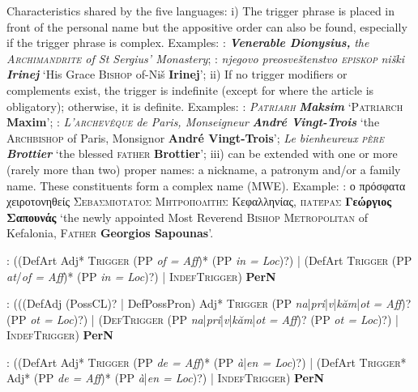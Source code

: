 \documentclass[output=paper]{langsci/langscibook}
\newcommand{\trigger}[1]{\textsc{#1}}
\begin{document}
Characteristics shared by the five languages: i) The trigger phrase is
placed in front of the personal name but the appositive order can also
be found, especially if the trigger phrase is complex. Examples: :
\textbf{\textit{Venerable Dionysius,}} \textit{the \trigger{Archimandrite} of St Sergius' Monastery}; :
\textit{njegovo preosveštenstvo \trigger{episkop}}
\textit{niški} \textbf{\textit{Irinej}} ‘His Grace \trigger{Bishop}
of-Niš \textbf{Irinej}’; ii) If no trigger modifiers or complements
exist, the trigger is indefinite (except for  where the article is
obligatory); otherwise, it is definite. Examples: :
\textit{\trigger{Patriarh}} \textbf{\textit{Maksim}} ‘\trigger{Patriarch}
\textbf{Maxim}’; : \textit{\trigger{L’archevêque}} \textit{de Paris,
Monseigneur }\textbf{\textit{André Vingt-Trois}} ‘the
\trigger{Archbishop} of Paris, Monsignor \textbf{André Vingt-Trois}’;
\textit{Le bienheureux }\textit{\trigger{père}}
\textbf{\textit{Brottier}} ‘the blessed \trigger{father}
\textbf{Brottier}’; iii)  can be extended with one or
more (rarely more than two) proper names: a nickname, a patronym and/or
a family name. These constituents form a complex name (MWE). Example: : ο
πρόσφατα χειροτονηθείς \trigger{Σεβασμιότατος Μητροπολίτης}
Κεφαλληνίας, \trigger{πατέρας} \textbf{Γεώργιος
Σαπουνάς} ‘the newly appointed Most Reverend \trigger{Bishop} \linebreak \trigger{ Metropolitan} of Kefalonia, \trigger{Father} \textbf{Georgios Sapounas}’.




: ((DefArt Adj* \trigger{Trigger} (PP \textit{of = Aff})* (PP
\textit{in = Loc})?) | (DefArt \trigger{Trigger} (PP
\textit{at}/\textit{of = Aff})* (PP \textit{in = Loc})?) | \trigger{IndefTrigger})
\textbf{PerN}



: (((DefAdj (PossCL)? | DefPossPron) Adj* \trigger{Trigger} (PP
\textit{na}|\textit{pri}|\textit{v}|\textit{kăm}|\textit{ot} \textit{= Aff})? (PP \textit{ot = Loc})?) |
(\trigger{DefTrigger} (PP \textit{na}|\textit{pri}|\textit{v}|\textit{kăm}|\textit{ot} \textit{= Aff})? (PP \textit{ot
= Loc})?) | \trigger{IndefTrigger)} \textbf{PerN}



: ((DefArt Adj* \trigger{Trigger} (PP \textit{de = Aff})* (PP
\textit{à}|\textit{en = Loc})?) | (DefArt \trigger{Trigger}* Adj* (PP \textit{de =
Aff})* (PP \textit{à}|\textit{en = Loc})?) | \trigger{IndefTrigger}) \textbf{PerN}
\end{document}
